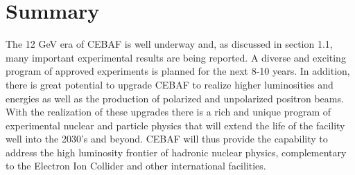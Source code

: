 \section{Summary}
The 12 GeV era of CEBAF is well underway and, as discussed in section 1.1, many important experimental results are being reported. A diverse and exciting program of approved experiments is planned for the next 8-10 years. In addition, there is great potential to upgrade CEBAF to realize higher luminosities and energies as well as the production of polarized and unpolarized positron beams. With the realization of these upgrades there is a rich and unique program of experimental nuclear and particle physics that will extend the life of the facility well into the 2030’s and beyond. CEBAF will thus provide the capability to address the high luminosity frontier of hadronic nuclear physics, complementary to the Electron Ion Collider and other international facilities. 